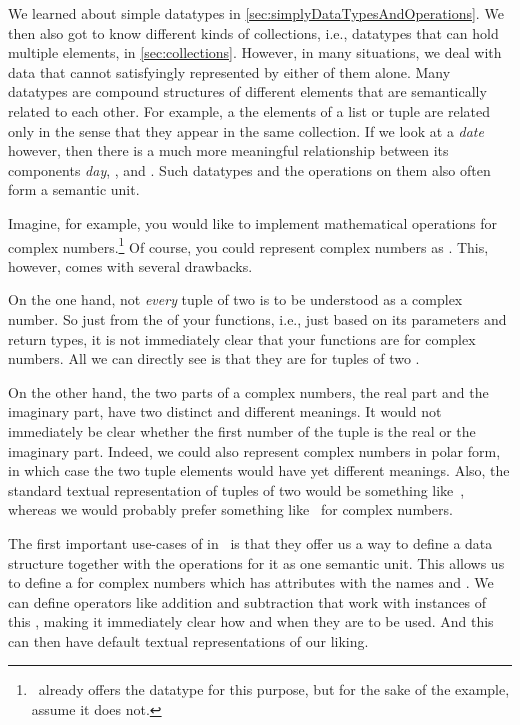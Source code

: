 %
%
We learned about simple datatypes in \cref{sec:simplyDataTypesAndOperations}.
We then also got to know different kinds of collections, i.e., datatypes that can hold multiple elements, in \cref{sec:collections}.
However, in many situations, we deal with data that cannot satisfyingly represented by either of them alone.
Many datatypes are compound structures of different elements that are semantically related to each other.
For example, a the elements of a list or tuple are related only in the sense that they appear in the same collection.
If we look at a \emph{date} however, then there is a much more meaningful relationship between its components \emph{day}, , and .
Such datatypes and the operations on them also often form a semantic unit.

Imagine, for example, you would like to implement mathematical operations for complex numbers.\footnote{%
\python\ already offers the datatype  for this purpose, but for the sake of the example, assume it does not.}
Of course, you could represent complex numbers as .
This, however, comes with several drawbacks.

On the one hand, not \emph{every} tuple of two  is to be understood as a complex number.
So just from the  of your functions, i.e., just based on its parameters and return types, it is not immediately clear that your functions are for complex numbers.
All we can directly see is that they are for tuples of two .

On the other hand, the two parts of a complex numbers, the real part and the imaginary part, have two distinct and different meanings.
It would not immediately be clear whether the first number of the tuple is the real or the imaginary part.
Indeed, we could also represent complex numbers in polar form, in which case the two tuple elements would have yet different meanings.
Also, the standard textual representation of tuples of two  would be something like~, whereas we would probably prefer something like~ for complex numbers.

The first important use-cases of  in \python\ is that they offer us a way to define a data structure together with the operations for it as one semantic unit.
This allows us to define a  for complex numbers which has attributes with the names  and .
We can define operators like addition and subtraction that work with instances of this , making it immediately clear how and when they are to be used.
And this  can then have default textual representations of our liking.

